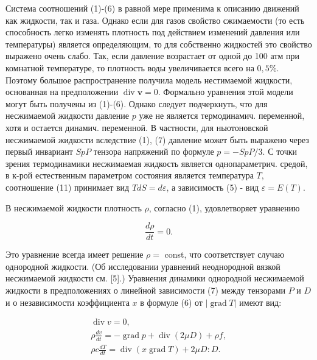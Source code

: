\documentclass[10pt]{article}
\begin{document}
Система соотношений (1)-(6) в равной мере применима к описанию движений как жидкости, так и газа. Однако если для газов свойство сжимаемости (то есть способность легко изменять плотность под действием изменений давления или температуры) является определяющим, то для собственно жидкостей это свойство выражено очень слабо. Так, если давление возрастает от одной до 100 атм при комнатной температуре, то плотность воды увеличивается всего на $0,5 \%$. Поэтому большое распространение получила модель нестимаемой жидкости, основанная на предположении $\operatorname{div} \boldsymbol{v}=0$. Формально уравнения этой модели могут быть получены из (1)-(6). Однако следует подчеркнуть, что для несжимаемой жидкости давление $p$ уже не является термодинамич. переменной, хотя и остается динамич. переменной. В частности, для ньютоновской несжимаемой жидкости вследствие (1), (7) давление может быть выражено через первый инвариант $S p P$ тензора напряжений по формуле $p=-S p P / 3$. С точки зрения термодинамики несжимаемая жидкость является однопараметрич. средой, в к-рой естественным параметром состояния является температура $T$, соотношение (11) принимает вид $T d S=d \varepsilon$, а зависимость (5) - вид $\varepsilon=E(T)$.



В несжимаемой жидкости плотность $\rho$, согласно (1), удовлетворяет уравнению



\[

\frac{d \rho}{d t}=0 .

\]



Это уравнение всегда имеет решение $\rho=$ const, что соответствует случаю однородной жидкости. (Об исследовании уравнений неоднородной вязкой несжимаемой жидкости см. [5].) Уравнения динамики однородной несжимаемой жидкости в предположениях о линейной зависимости (7) между тензорами $P$ и $D$ и о независимости коэффициента $x$ в формуле (6) от $|\operatorname{grad} T|$ имеют вид:



\[

\begin{gathered}

\operatorname{div} v=0, \\

\rho \frac{d v}{d t}=-\operatorname{grad} p+\operatorname{div}(2 \mu D)+\rho f, \\

\rho c \frac{d T}{d t}=\operatorname{div}(x \operatorname{grad} T)+2 \mu D: D .

\end{gathered}

\]
\end{document}
